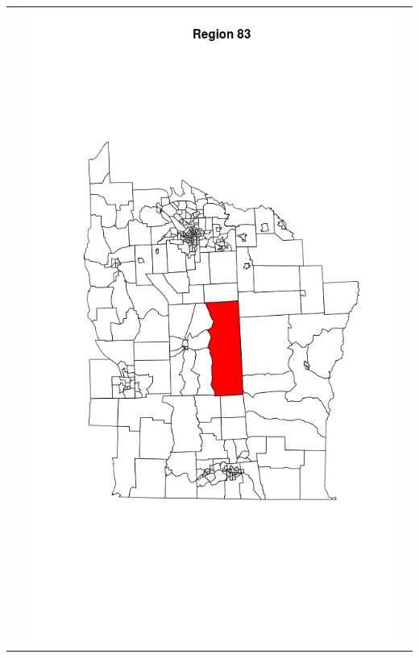 \documentclass[12pt]{article}
\begin{document}
\begin{tabular}{|c|c|c|}
			  & \includegraphics[scale=0.2]{ny83.png}

\end{tabular}
\end{document}
